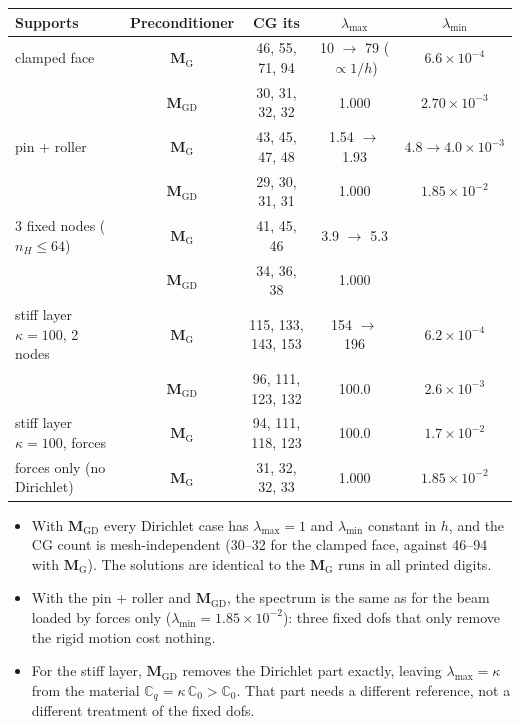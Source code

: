 \documentclass[11pt,a4paper]{article}
\begin{document}
\begin{center}
\small\setlength{\tabcolsep}{3.5pt}
\begin{tabular}{lcccc}
  \toprule
  Supports & Preconditioner & CG its & $\lambda_{\max}$ & $\lambda_{\min}$ \\
  \midrule
  clamped face          & $\mathbf{M}_{\mathrm{G}}$  & 46, 55, 71, 94 & 10 $\to$ 79 ($\propto 1/h$) & $6.6\times10^{-4}$ \\
                        & $\mathbf{M}_{\mathrm{GD}}$ & 30, 31, 32, 32 & 1.000 & $2.70\times10^{-3}$ \\
  pin + roller          & $\mathbf{M}_{\mathrm{G}}$  & 43, 45, 47, 48 & 1.54 $\to$ 1.93 & $4.8 \to 4.0\times10^{-3}$ \\
                        & $\mathbf{M}_{\mathrm{GD}}$ & 29, 30, 31, 31 & 1.000 & $1.85\times10^{-2}$ \\
  3 fixed nodes ($n_H\le64$) & $\mathbf{M}_{\mathrm{G}}$ & 41, 45, 46 & 3.9 $\to$ 5.3 & \\
                        & $\mathbf{M}_{\mathrm{GD}}$ & 34, 36, 38 & 1.000 & \\
  stiff layer $\kappa=100$, 2 nodes & $\mathbf{M}_{\mathrm{G}}$ & 115, 133, 143, 153 & 154 $\to$ 196 & $6.2\times10^{-4}$ \\
                        & $\mathbf{M}_{\mathrm{GD}}$ & 96, 111, 123, 132 & 100.0 & $2.6\times10^{-3}$ \\
  stiff layer $\kappa=100$, forces & $\mathbf{M}_{\mathrm{G}}$ & 94, 111, 118, 123 & 100.0 & $1.7\times10^{-2}$ \\
  forces only (no Dirichlet) & $\mathbf{M}_{\mathrm{G}}$ & 31, 32, 32, 33 & 1.000 & $1.85\times10^{-2}$ \\
  \bottomrule
\end{tabular}
\end{center}

\begin{itemize}
  \item With $\mathbf{M}_{\mathrm{GD}}$ every Dirichlet case has $\lambda_{\max} = 1$ and $\lambda_{\min}$ constant in $h$, and
        the CG count is mesh-independent (30--32 for the clamped face, against 46--94 with $\mathbf{M}_{\mathrm{G}}$). The
        solutions are identical to the $\mathbf{M}_{\mathrm{G}}$ runs in all printed digits.
  \item With the pin + roller and $\mathbf{M}_{\mathrm{GD}}$, the spectrum is the same as for the beam loaded by forces
        only ($\lambda_{\min} = 1.85\times10^{-2}$): three fixed dofs that only remove the rigid motion cost nothing.
  \item For the stiff layer, $\mathbf{M}_{\mathrm{GD}}$ removes the Dirichlet part exactly, leaving $\lambda_{\max} = \kappa$
        from the material $\mathbb{C}_q = \kappa\,\mathbb{C}_0 > \mathbb{C}_0$. That part needs a different reference, not
        a different treatment of the fixed dofs.
\end{itemize}
\end{document}
